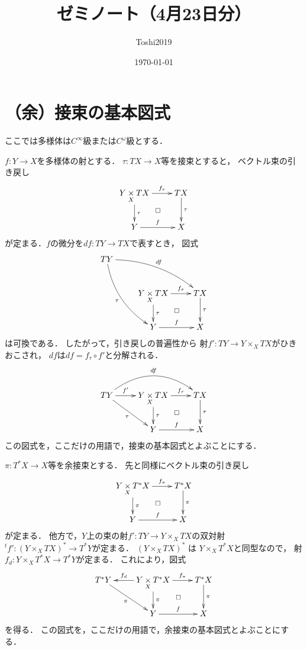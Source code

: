 \title{ゼミノート（4月23日分）}
\author{Toshi2019}
\date{\today}

\maketitle
\tableofcontents

\section{（余）接束の基本図式}
ここでは多様体は\(C^\infty\)級または\(C^\omega\)級とする．

\(f\colon Y\to X\)を多様体の射とする．
\(\tau\colon TX\to X\)等を接束とすると，
ベクトル束の引き戻し
\[\xymatrix{
  Y\pb[X]TX
  \ar[r]^-{f_{\tau}}
  \ar[d]^-{\tau}
  \ar@{}[dr]|\square
  &
  TX
  \ar[d]^-{\tau}
  \\
  Y\ar[r]^-{f}&X
}\]
が定まる．\(f\)の微分を\(df\colon TY\to TX\)で表すとき，
図式
\[\xymatrix{
  TY
  \ar@/^1pc/[rrd]^-{df}
  \ar@/_1pc/[rdd]_-{\tau}\\
  &Y\pb[X]TX
  \ar[r]^-{f_{\tau}}
  \ar[d]^-{\tau}
  \ar@{}[dr]|\square
  &
  TX
  \ar[d]^-{\tau}
  \\
  &Y\ar[r]^-{f}&X
}\]
は可換である．
したがって，引き戻しの普遍性から
射\(f'\colon TY\to Y\mathbin{\times_{X}}TX\)がひきおこされ，
\(df\)は\(df=f_{\tau}\circ f'\)と分解される．
\begin{equation}\vcenter{
\xymatrix{
  TY
  \ar@/^2pc/[rr]^-{df}
  \ar[r]^-{f'}
  \ar[rd]_-{\tau}
  &Y\pb[X]TX
  \ar[r]^-{f_{\tau}}
  \ar[d]^-{\tau}
  \ar@{}[dr]|\square
  &
  TX
  \ar[d]^-{\tau}
  \\
  &Y\ar[r]^-{f}&X
}}\end{equation}
この図式を，ここだけの用語で，接束の基本図式とよぶことにする．

\(\pi\colon T^{\ast}X\to X\)等を余接束とする．
先と同様にベクトル束の引き戻し
\[\xymatrix{
  Y\pb[X]T^{\ast}X
  \ar[r]^-{f_{\pi}}
  \ar[d]^-{\pi}
  \ar@{}[dr]|\square
  &
  T^{\ast}X
  \ar[d]^-{\pi}
  \\
  Y\ar[r]^-{f}&X
}\]
が定まる．
他方で，\(Y\)上の束の射\(
  f'\colon TY\to Y\mathbin{\times_{X}}TX
\)の双対射\(
  {}^{t\!}f'\colon \left(Y\mathbin{\times_{X}}TX\right)^{\ast}\to T^{\ast}Y
\)が定まる．
\(\left(Y\mathbin{\times_{X}}TX\right)^{\ast}\)
は
\(Y\mathbin{\times_{X}}T^{\ast}X\)と同型なので，
射\(
  f_{d}\colon Y\mathbin{\times_{X}}T^{\ast}X\to T^{\ast}Y
\)が定まる．
これにより，図式
\begin{equation}\label{eq:cot}
\vcenter{\xymatrix{
  T^{\ast}Y
  \ar[rd]_-{\pi}
  &
  Y\pb[X]T^{\ast}X
  \ar[l]_-{f_{d}}
  \ar[r]^-{f_{\pi}}
  \ar[d]^-{\pi}
  \ar@{}[dr]|\square
  &
  T^{\ast}X
  \ar[d]^-{\pi}
  \\
  &Y\ar[r]^-{f}&X
}}\end{equation}
を得る．
この図式を，ここだけの用語で，余接束の基本図式とよぶことにする．

